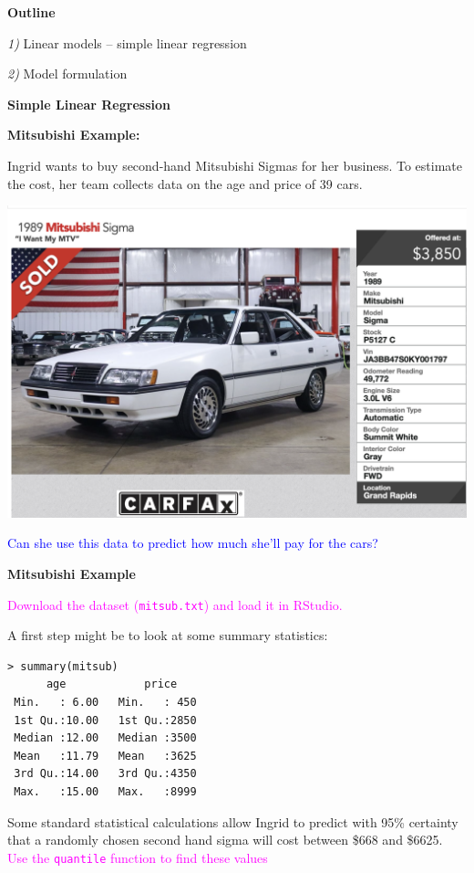 \documentclass[landscape]{slides}
\newcommand{\heading}[1]{%
  \begin{center}
    \large\bf \color{red}
        #1
  \end{center}
  \vspace{1ex minus 1ex}}
\begin{document}
\begin{slide}
\heading{Outline}
\vskip 1.0cm
{\em 1)} Linear models -- simple linear regression

{\em 2)} Model formulation


\end{slide}




\begin{slide}
	\heading{Simple Linear Regression}
	{\bf Mitsubishi Example:}
	
	Ingrid wants to buy second-hand Mitsubishi Sigmas for her business. To estimate the cost, her team collects data on the age and price of 39 cars.
	
	  \begin{minipage}{0.55\textwidth}
		\includegraphics[width=\textwidth]{car.png}
	\end{minipage}%
	\begin{minipage}{0.35\textwidth}
		\textcolor{blue}{  Can she use this data to predict how much she'll pay for the cars?}
	\end{minipage}
	
\end{slide}


\begin{slide}
\heading{Mitsubishi Example}
%
\textcolor{magenta}{Download the dataset ({\tt mitsub.txt}) and load it in RStudio.}

A first step might be to look at some summary statistics:
%
{\small
\begin{verbatim}
> summary(mitsub)
      age            price     
 Min.   : 6.00   Min.   : 450  
 1st Qu.:10.00   1st Qu.:2850  
 Median :12.00   Median :3500  
 Mean   :11.79   Mean   :3625  
 3rd Qu.:14.00   3rd Qu.:4350  
 Max.   :15.00   Max.   :8999  
\end{verbatim}
}

Some standard statistical calculations allow Ingrid to predict with 95\%
certainty that a randomly chosen second hand sigma will cost between
\$668 and \$6625. 
\textcolor{magenta}{Use the {\tt quantile} function to find these values }
\end{slide}
\end{document}
